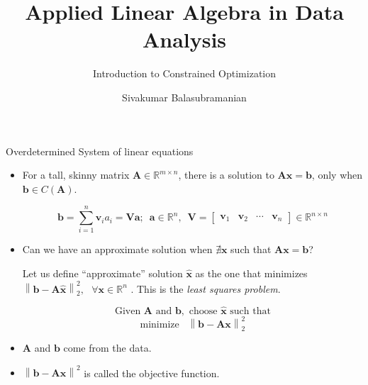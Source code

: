 \documentclass[aspectratio=169]{beamer}
\title{Applied Linear Algebra in Data Analysis}
\subtitle{Introduction to Constrained Optimization}
\author{Sivakumar Balasubramanian}
\institute[Christian Medical College] %
{
  \inst{}%
  Department of Bioengineering\\
  Christian Medical College, Bagayam\\
  Vellore 632002
}
\date{}
\let\olditem\item
\renewcommand{\item}{\setlength{\itemsep}{\fill}\olditem}
\begin{document}


\begin{frame}
  \titlepage
\end{frame}


\begin{frame}[t]{Overdetermined System of linear equations}
\begin{itemize}
\item For a tall, skinny matrix $\mathbf{A} \in \mathbb{R}^{m \times n}$, there is a solution to $\mathbf{Ax} = \mathbf{b}$, only when $\mathbf{b} \in C\left(\mathbf{A}\right)$.

\[ \mathbf{b} = \sum_{i=1}^{n} \mathbf{v}_i a_i = \mathbf{V}\mathbf{a}; \,\,\, \mathbf{a} \in \mathbb{R}^n, \,\,\, \mathbf{V} = \begin{bmatrix*}\mathbf{v}_1 & \mathbf{v}_2 & \cdots & \mathbf{v}_n\end{bmatrix*} \in \mathbb{R}^{n \times n} \]

\item Can we have an approximate solution when $\nexists \mathbf{x}$ such that $\mathbf{Ax} = \mathbf{b}$?

Let us define ``approximate'' solution $\hat{\mathbf{x}}$ as the one that minimizes $\left\lVert \mathbf{b} - \mathbf{A}\hat{\mathbf{x}}\right\rVert_2^2, \,\,\,\, \forall \mathbf{x} \in \mathbb{R}^n$ . This is the \textit{least squares problem}.

\[ \text{Given } \mathbf{A} \text{ and } \mathbf{b}, \text{ choose } \hat{\mathbf{x}} \text{ such that} \] \[ \text{minimize }\,\,\, \left\lVert \mathbf{b} - \mathbf{Ax}\right\rVert_2^2 \]

\item $\mathbf{A}$ and $\mathbf{b}$ come from the data.

\item $\left\lVert \mathbf{b} - \mathbf{Ax}\right\rVert^2$ is called the objective function.
\end{itemize}
\end{frame}
\end{document}
